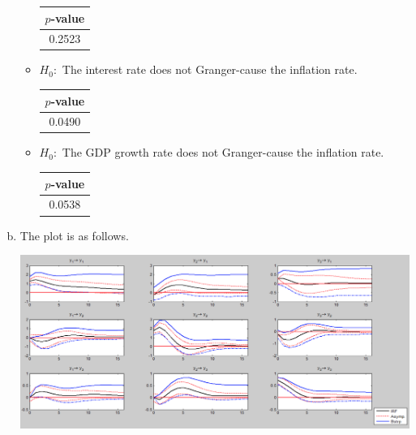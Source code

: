 \documentclass[answers]{exam}
\begin{document}
\begin{questions}
\begin{solution}
\begin{enumerate}[(a)]
\begin{itemize}
                \begin{center}
                  \begin{tabular}{*1c}
                    \toprule
                    $p$-value\\
                    \midrule
                    0.2523\\
                    \bottomrule
                  \end{tabular}
                \end{center}
                \item $H_{0}: $ The interest rate does not Granger-cause the inflation rate.
                \begin{center}
                  \begin{tabular}{*1c}
                    \toprule
                    $p$-value\\
                    \midrule
                    0.0490\\
                    \bottomrule
                  \end{tabular}
                \end{center}
                \item $H_{0}: $ The GDP growth rate does not Granger-cause the inflation rate.
                \begin{center}
                  \begin{tabular}{*1c}
                    \toprule
                    $p$-value\\
                    \midrule
                    0.0538\\
                    \bottomrule
                  \end{tabular}
                \end{center}
            \end{itemize}
            \item The plot is as follows.\par
            \begin{center}
            \includegraphics[scale=0.25]{Problem3.png}

\end{center}
\end{enumerate}
\end{solution}
\end{questions}
\end{document}
